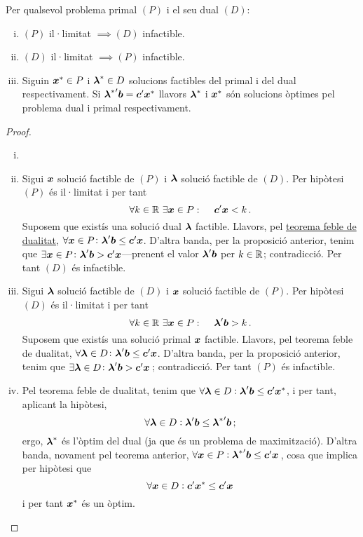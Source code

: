 \begin{col}\label{col:feb}
	Per qualsevol problema primal $(P)$ i el seu dual $(D)$: 
    \begin{enumerate}[i)]
        \item $\left(P\right)$ il·limitat $\implies \left(D\right)$ infactible.
        \item $\left(D\right)$ il·limitat $\implies \left(P\right)$ infactible.
        \item Siguin $\boldsymbol{\boldsymbol{x}}^\ast \in P$ i $\boldsymbol{\boldsymbol{\lambda}}^\ast \in D$ solucions factibles del primal i del dual respectivament. Si ${\boldsymbol{\boldsymbol{\lambda}}^\ast}'\boldsymbol{b} = \boldsymbol{\boldsymbol{c}}'\boldsymbol{\boldsymbol{x}}^\ast$ llavors $\boldsymbol{\boldsymbol{\lambda}}^\ast$ i $\boldsymbol{\boldsymbol{x}}^\ast$ són solucions òptimes pel problema dual i primal respectivament.
    \end{enumerate}
	\begin{proof}
		\begin{enumerate}[i)]
			\item[]
			\item Sigui $\boldsymbol{\boldsymbol{x}}$ solució factible de $(P)$ i $\boldsymbol{\boldsymbol{\lambda}}$ solució factible de $(D)$. Per hipòtesi $(P)$ és il·limitat i per tant \[\forall k \in \mathbb{R}\ \exists \boldsymbol{x}\in P\operatorname{\colon\quad} \boldsymbol{c}'\boldsymbol{x} < k\,. \] Suposem que existís una solució dual $\boldsymbol{\lambda}$ factible. Llavors, pel \hyperref[teo:dualitat-feble]{teorema feble de dualitat}, $\forall \boldsymbol{\boldsymbol{x}}\in P\colon \boldsymbol{\boldsymbol{\lambda}}'\boldsymbol{b} \le \boldsymbol{\boldsymbol{c}}'\boldsymbol{\boldsymbol{x}}$. D'altra banda, per la proposició anterior, tenim que $\exists \boldsymbol{\boldsymbol{x}}\in P\colon \boldsymbol{\boldsymbol{\lambda}}'\boldsymbol{b} > \boldsymbol{\boldsymbol{c}}'\boldsymbol{\boldsymbol{x}}$---prenent el valor $\boldsymbol{\boldsymbol{\lambda}}'\boldsymbol{b}$ per $k\in\mathbb{R}$; contradicció. Per tant $(D)$ és infactible.
			\item Sigui $\boldsymbol{\boldsymbol{\lambda}}$ solució factible de $(D)$ i $\boldsymbol{\boldsymbol{x}}$ solució factible de $(P)$. Per hipòtesi $(D)$ és il·limitat i per tant \[\forall k \in \mathbb{R}\ \exists \boldsymbol{\boldsymbol{x}}\in P\operatorname{\colon\quad} \boldsymbol{\boldsymbol{\lambda}}'\boldsymbol{b} > k\,. \] Suposem que existís una solució primal $\boldsymbol{\boldsymbol{x}}$ factible. Llavors, pel {teorema feble de dualitat}, $\forall \boldsymbol{\boldsymbol{\lambda}}\in D\colon \boldsymbol{\boldsymbol{\lambda}}'\boldsymbol{b} \le \boldsymbol{\boldsymbol{c}}'\boldsymbol{\boldsymbol{x}}$. D'altra banda, per la proposició anterior, tenim que $\exists \boldsymbol{\lambda}\in D\colon \boldsymbol{\lambda}'\boldsymbol{b} > \boldsymbol{c}'\boldsymbol{x}\,$; contradicció. Per tant $(P)$ és infactible.
			\item Pel teorema feble de dualitat, tenim que $\forall \boldsymbol{\lambda} \in D: \boldsymbol{\lambda}'\boldsymbol{b} \le \boldsymbol{c}'{\boldsymbol{x}^\ast}$, i per tant, aplicant la hipòtesi, \[\forall \boldsymbol{\lambda} \in D: \boldsymbol{\lambda} '\boldsymbol{b} \le {\boldsymbol{\lambda}^\ast}'\boldsymbol{b}\,;\] ergo, $\boldsymbol{\lambda}^\ast$ és l'òptim del dual (ja que és un problema de maximització). D'altra banda, novament pel teorema anterior, $\forall \boldsymbol{x} \in P: {\boldsymbol{\lambda}^\ast}'\boldsymbol{b} \le \boldsymbol{c}'\boldsymbol{x}\,$, cosa que implica per hipòtesi que \[\forall \boldsymbol{x} \in D: \boldsymbol{c}'{\boldsymbol{x}^\ast} \le \boldsymbol{c}'\boldsymbol{x}\] i per tant $\boldsymbol{x}^\ast$ és un òptim.
		\end{enumerate}
	\end{proof}
\end{col}

